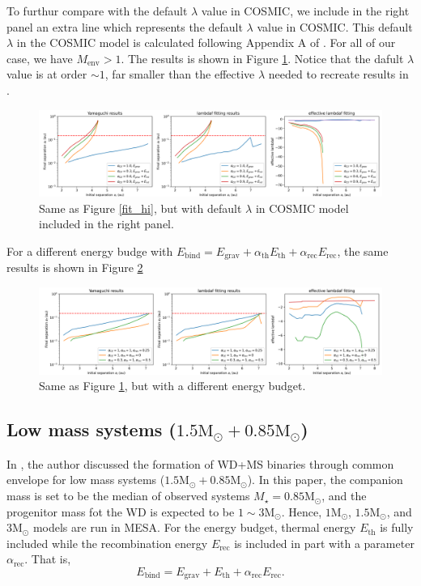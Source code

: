 \documentclass[12pt]{article}
\newcommand{\Msun}{\mathrm{M_{\odot}}}
\newcommand{\Mstar}{M_{\star}}
\newcommand{\alphath}{\alpha_{\mathrm{th}}}
\newcommand{\alpharec}{\alpha_{\mathrm{rec}}}
\newcommand{\Ebind}{E_{\mathrm{bind}}}
\newcommand{\Egrav}{E_{\mathrm{grav}}}
\newcommand{\Eth}{E_{\mathrm{th}}}
\newcommand{\Erec}{E_{\mathrm{rec}}}
\begin{document}
To furthur compare with the default $\lambda$ value in COSMIC, we include in the right panel an extra line which represents the default $\lambda$ value in COSMIC. This default $\lambda$ in the COSMIC model is calculated following Appendix A of \cite{claeys2014theoretical}. For all of our case, we have $M_{\mathrm{env}} > 1$. The results is shown in Figure \ref{fit_cmp_hi}. Notice that the dafult $\lambda$ value is at order $\sim 1$, far smaller than the effective $\lambda$ needed to recreate results in \cite{yamaguchi_hi}.

\begin{figure}
    \centering
    \includegraphics[width=\linewidth]{7+1cmp.png}
    \caption{Same as Figure \ref{fit_hi}, but with default $\lambda$ in COSMIC model included in the right panel.}
    \label{fit_cmp_hi}
\end{figure}

For a different energy budge with $\Ebind = \Egrav + \alphath \Eth + \alpharec \Erec$, the same results is shown in Figure \ref{fit_cmp_eb_hi}

\begin{figure}
    \centering
    \includegraphics[width=\linewidth]{7+1ebcmp.png}
    \caption{Same as Figure \ref{fit_cmp_hi}, but with a different energy budget.}
    \label{fit_cmp_eb_hi}
\end{figure}


\subsection{Low mass systems ($1.5\Msun + 0.85\Msun$)}

In \cite{yamaguchi_lo}, the author discussed the formation of WD+MS binaries through common envelope for low mass systems ($1.5\Msun + 0.85\Msun$). In this paper, the companion mass is set to be the median of observed systems $\Mstar = 0.85\Msun$, and the progenitor mass fot the WD is expected to be $1 \sim 3 \Msun$. Hence, $1\Msun$, $1.5\Msun$, and $3\Msun$ models are run in MESA. For the energy budget, thermal energy $\Eth$ is fully included while the recombination energy $\Erec$ is included in part with a parameter $\alpharec$. That is,
\[
    \Ebind = \Egrav + \Eth + \alpharec \Erec.
\]
 
\end{document}
